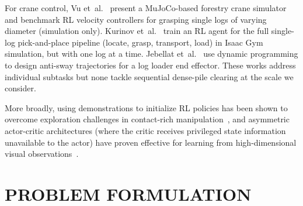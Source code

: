 \documentclass[letterpaper, 10 pt, conference]{ieeeconf}
\begin{document}
For crane control, Vu et~al.~\cite{vu2025autonomous} present a MuJoCo-based forestry crane simulator and benchmark RL velocity controllers for grasping single logs of varying diameter (simulation only).
Kurinov et~al.~\cite{kurinov2025reinforcement} train an RL agent for the full single-log pick-and-place pipeline (locate, grasp, transport, load) in Isaac Gym simulation, but with one log at a time.
Jebellat et~al.~\cite{jebellat2025designing} use dynamic programming to design anti-sway trajectories for a log loader end effector.
These works address individual subtasks but none tackle sequential dense-pile clearing at the scale we consider.

More broadly, using demonstrations to initialize RL policies has been shown to overcome exploration challenges in contact-rich manipulation~\cite{rajeswaran2018learning, nair2018overcoming}, and asymmetric actor-critic architectures (where the critic receives privileged state information unavailable to the actor) have proven effective for learning from high-dimensional visual observations~\cite{pinto2018asymmetric}.
\section{PROBLEM FORMULATION}
\end{document}

